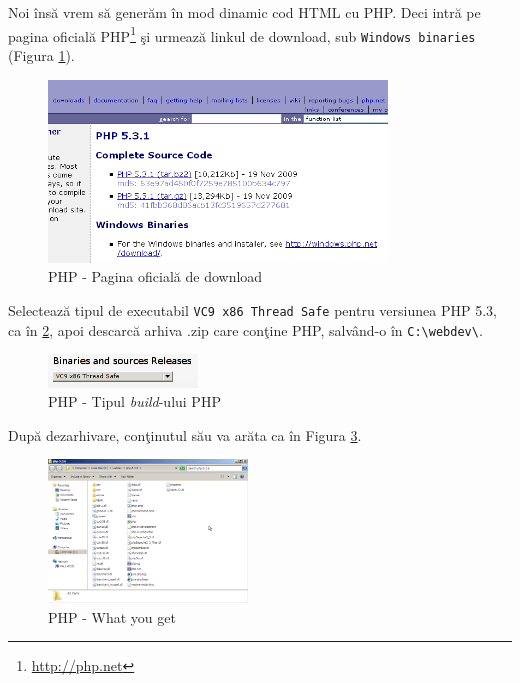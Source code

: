 Noi însă vrem să generăm în mod dinamic cod HTML cu PHP. Deci intră pe pagina oficială
PHP\footnote{\url{http://php.net}} şi urmează linkul de download,
sub \texttt{Windows binaries} (Figura \ref{fig:php win bin}).


\begin{figure}[ht!]
  \centering
    \includegraphics[width=340px]{cap01/Screenshot-6.png}
  \caption{PHP - Pagina oficială de download}
  \label{fig:php win bin}
\end{figure}

Selectează tipul de executabil \texttt{VC9 x86 Thread Safe} pentru
versiunea PHP 5.3, ca în \ref{fig:php build type}, apoi
descarcă arhiva .zip care conţine PHP, salvând-o în \texttt{C:{\textbackslash}webdev\textbackslash}.
\begin{figure}[ht!]
  \centering
    \includegraphics[width=150px]{cap01/Screenshot-7.png}
  \caption{PHP - Tipul \textsl{build}-ului PHP}
  \label{fig:php build type}
\end{figure}



După dezarhivare, conţinutul său va arăta ca în Figura \ref{fig:php what you get}.

\begin{figure}[ht!]
  \centering
    \includegraphics[width=200px]{cap01/Screenshot-9.png}
  \caption{PHP - What you get}
  \label{fig:php what you get}
\end{figure}

